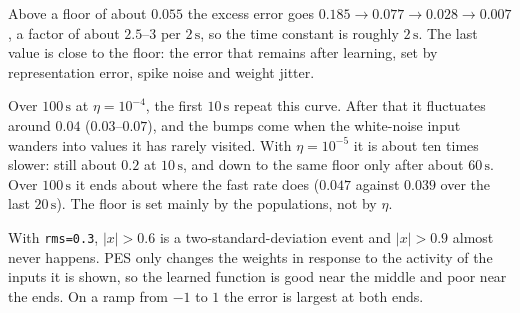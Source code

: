 \documentclass[11pt,letterpaper]{article}
\newcommand{\ans}[1]{\par\vspace{4pt}{\bfseries #1}\quad}
\begin{document}
\ans{Q1}
Above a floor of about $0.055$ the excess error goes $0.185 \to 0.077 \to 0.028 \to 0.007$, a factor of about $2.5$--$3$ per $2\,\mathrm{s}$, so the time constant is roughly $2\,\mathrm{s}$. The last value is close to the floor: the error that remains after learning, set by representation error, spike noise and weight jitter.

Over $100\,\mathrm{s}$ at $\eta = 10^{-4}$, the first $10\,\mathrm{s}$ repeat this curve. After that it fluctuates around $0.04$ ($0.03$--$0.07$), and the bumps come when the white-noise input wanders into values it has rarely visited. With $\eta = 10^{-5}$ it is about ten times slower: still about $0.2$ at $10\,\mathrm{s}$, and down to the same floor only after about $60\,\mathrm{s}$. Over $100\,\mathrm{s}$ it ends about where the fast rate does ($0.047$ against $0.039$ over the last $20\,\mathrm{s}$). The floor is set mainly by the populations, not by $\eta$.
\begin{center}
\end{center}

\ans{Q2}
With \texttt{rms=0.3}, $|x| > 0.6$ is a two-standard-deviation event and $|x| > 0.9$ almost never happens. PES only changes the weights in response to the activity of the inputs it is shown, so the learned function is good near the middle and poor near the ends. On a ramp from $-1$ to $1$ the error is largest at both ends.
\end{document}
